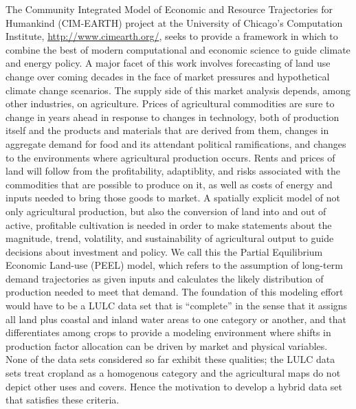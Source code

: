 The Community Integrated Model of Economic and Resource Trajectories
for Humankind (CIM-EARTH) project at the University of Chicago's
Computation Institute, \url{http://www.cimearth.org/}, seeks to
provide a framework in which to combine the best of modern
computational and economic science to guide climate and energy policy.
A major facet of this work involves forecasting of land use change
over coming decades in the face of market pressures and hypothetical
climate change scenarios.  The supply side of this market analysis
depends, among other industries, on agriculture.  Prices of
agricultural commodities are sure to change in years ahead in response
to changes in technology, both of production itself and the products
and materials that are derived from them, changes in aggregate demand
for food and its attendant political ramifications, and changes to the
environments where agricultural production occurs.  Rents and prices
of land will follow from the profitability, adaptiblity, and risks
associated with the commodities that are possible to produce on it, as
well as costs of energy and inputs needed to bring those goods to
market.  A spatially explicit model of not only agricultural
production, but also the conversion of land into and out of active,
profitable cultivation is needed in order to make statements about the
magnitude, trend, volatility, and sustainability of agricultural
output to guide decisions about investment and policy.  We call this
the Partial Equilibrium Economic Land-use (PEEL) model, which refers
to the assumption of long-term demand trajectories as given inputs and
calculates the likely distribution of production needed to meet that
demand.  The foundation of this modeling effort would have to be a
LULC data set that is ``complete'' in the sense that it assigns all
land plus coastal and inland water areas to one category or another,
and that differentiates among crops to provide a modeling environment
where shifts in production factor allocation can be driven by market
and physical variables.  None of the data sets considered so far
exhibit these qualities; the LULC data sets treat cropland as a
homogenous category and the agricultural maps do not depict other uses
and covers.  Hence the motivation to develop a hybrid data set that
satisfies these criteria.

